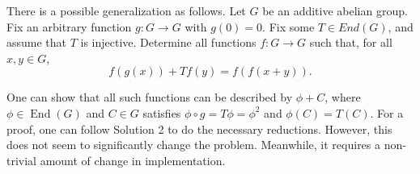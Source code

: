 \documentclass{article}
\DeclareMathOperator{\End}{End}
\begin{document}
There is a possible generalization as follows.
Let $G$ be an additive abelian group.
Fix an arbitrary function $g : G \to G$ with $g(0) = 0$.
Fix some $T \in End(G)$, and assume that $T$ is injective.
Determine all functions $f : G \to G$ such that, for all $x, y \in G$,
\[ f(g(x)) + T f(y) = f(f(x + y)). \]

One can show that all such functions can be described by $\phi + C$, where $\phi \in \End(G)$ and $C \in G$ satisfies $\phi \circ g = T \phi = \phi^2$ and $\phi(C) = T(C)$.
For a proof, one can follow Solution 2 to do the necessary reductions.
However, this does not seem to significantly change the problem.
Meanwhile, it requires a non-trivial amount of change in implementation.
\end{document}
